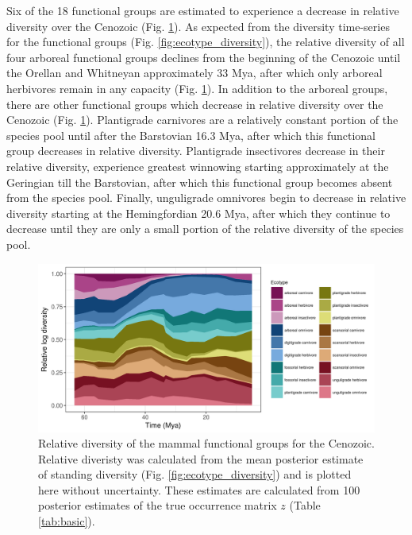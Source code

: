 \documentclass[12pt,letterpaper]{article}
\begin{document}
Six of the 18 functional groups are estimated to experience a decrease in relative diversity over the Cenozoic (Fig. \ref{fig:ecotype_relative}). As expected from the diversity time-series for the functional groups (Fig. \ref{fig:ecotype_diversity}), the relative diversity of all four arboreal functional groups declines from the beginning of the Cenozoic until the Orellan and Whitneyan approximately 33 Mya, after which only arboreal herbivores remain in any capacity (Fig. \ref{fig:ecotype_relative}). In addition to the arboreal groups, there are other functional groups which decrease in relative diversity over the Cenozoic (Fig. \ref{fig:ecotype_relative}). Plantigrade carnivores are a relatively constant portion of the species pool until after the Barstovian 16.3 Mya, after which this functional group decreases in relative diversity. Plantigrade insectivores decrease in their relative diversity, experience greatest winnowing starting approximately at the Geringian till the Barstovian, after which this functional group becomes absent from the species pool. Finally, unguligrade omnivores begin to decrease in relative diversity starting at the Hemingfordian 20.6 Mya, after which they continue to decrease until they are only a small portion of the relative diversity of the species pool.
\begin{figure}[ht]
  \centering
  \includegraphics[width=\textwidth,height=0.5\textheight,keepaspectratio=true]{figure/relative_diversity}
  \caption{Relative diversity of the mammal functional groups for the Cenozoic. Relative diveristy was calculated from the mean posterior estimate of standing diversity (Fig. \ref{fig:ecotype_diversity}) and is plotted here without uncertainty. These estimates are calculated from 100 posterior estimates of the true occurrence matrix \(z\) (Table \ref{tab:basic}).}
  \label{fig:ecotype_relative}
\end{figure}
\end{document}
